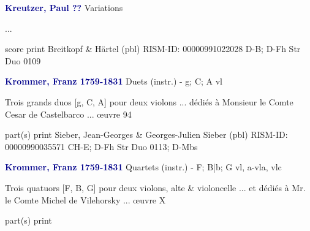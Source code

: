 \documentclass[twocolumn]{book}
\begin{document}
\newline \par \vspace{7pt} \textcolor{darkblue}{\textbf{Kreutzer, Paul  ??}}
\newline Variations
\newline \begin{itshape}...\end{itshape} 
\newline \textcolor{darkblue}{}  score
\newline print
\newline Breitkopf \& Härtel  (pbl)
\newline RISM-ID: 00000991022028
\newline D-B; D-Fh  Str Duo 0109
\newline \par \vspace{7pt} \textcolor{darkblue}{\textbf{Krommer, Franz  1759-1831}}
\newline Duets (instr.) - g; C; A
 vl
\newline \begin{itshape}Trois grands duos [g, C, A] pour deux violons ... dédiés à Monsieur le Comte Cesar de Castelbarco ... œuvre 94\end{itshape} 
\newline \textcolor{darkblue}{}  part(s)
\newline print
\newline Sieber, Jean-Georges \& Georges-Julien Sieber  (pbl)
\newline RISM-ID: 00000990035571
\newline CH-E; D-Fh  Str Duo 0113; D-Mbs
\newline \par \vspace{7pt} \textcolor{darkblue}{\textbf{Krommer, Franz  1759-1831}}
\newline Quartets (instr.) - F; B|b; G
 vl, a-vla, vlc
\newline \begin{itshape}Trois quatuors [F, B, G] pour deux violons, alte \& violoncelle ... et dédiés à Mr. le Comte Michel de Vilehorsky ... œuvre X\end{itshape} 
\newline \textcolor{darkblue}{}  part(s)
\newline print
\end{document}
